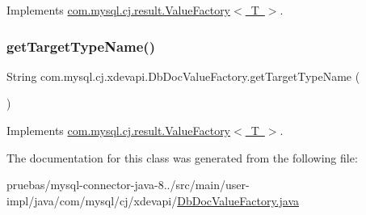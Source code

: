 Implements \mbox{\hyperlink{interfacecom_1_1mysql_1_1cj_1_1result_1_1_value_factory_a56a65ddc42f449859a1dedb6395016cf}{com.\+mysql.\+cj.\+result.\+Value\+Factory$<$ T $>$}}.

\mbox{\label{classcom_1_1mysql_1_1cj_1_1xdevapi_1_1_db_doc_value_factory_af2ac0c4c05e6606e87b045f8eaed3f1e}} 
\subsubsection{\texorpdfstring{get\+Target\+Type\+Name()}{getTargetTypeName()}}
{\footnotesize\ttfamily String com.\+mysql.\+cj.\+xdevapi.\+Db\+Doc\+Value\+Factory.\+get\+Target\+Type\+Name (\begin{DoxyParamCaption}{ }\end{DoxyParamCaption})}



Implements \mbox{\hyperlink{interfacecom_1_1mysql_1_1cj_1_1result_1_1_value_factory_a54de50a710778bcff410434107d34036}{com.\+mysql.\+cj.\+result.\+Value\+Factory$<$ T $>$}}.



The documentation for this class was generated from the following file\+:\begin{DoxyCompactItemize}
\item 
pruebas/mysql-\/connector-\/java-\/8../src/main/user-\/impl/java/com/mysql/cj/xdevapi/\mbox{\hyperlink{_db_doc_value_factory_8java}{Db\+Doc\+Value\+Factory.\+java}}\end{DoxyCompactItemize}
